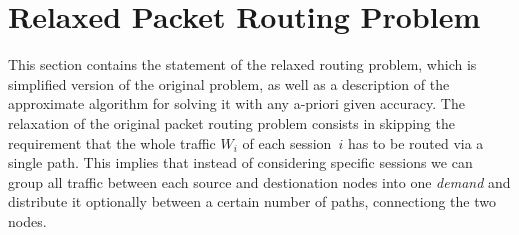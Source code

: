 \documentclass{ifacconf}
\begin{document}
\section{Relaxed Packet Routing Problem} \label{formulation}

This section contains the statement of the relaxed routing problem, which is
simplified version of the original problem, as well as a description of the approximate
algorithm for solving it with any a-priori given accuracy. The relaxation of the original packet routing problem consists in
skipping the requirement that the whole traffic $W_i$ of each
session~$i$ has to be routed via a single path. This implies
that instead of considering specific sessions we can group
all traffic between each source and destionation nodes into
one {\em demand} and distribute it optionally between a certain
number of paths, connectiong the two nodes.
\end{document}
